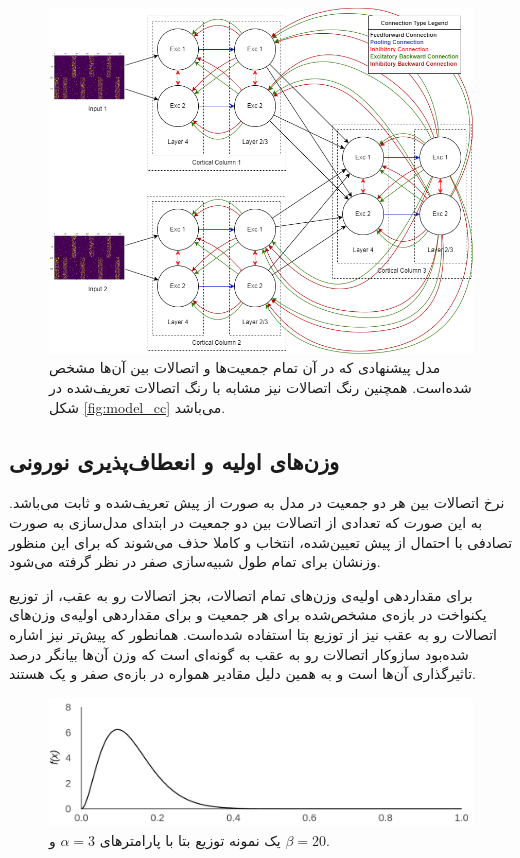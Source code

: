 \documentclass[12pt]{report}
\begin{document}
	\begin{figure}[]
		\centering
		\includegraphics[width=1.0\linewidth]{model_overall.png}
		\caption[NS]{
			مدل پیشنهادی که در آن تمام جمعیت‌ها و اتصالات بین آن‌ها مشخص شده‌است. همچنین رنگ اتصالات نیز مشابه با رنگ اتصالات تعریف‌شده در شکل \ref{fig:model_cc} می‌باشد.
		}
		\label{fig:model_overall} 
	\end{figure}

	\subsection{وزن‌های اولیه و انعطاف‌پذیری نورونی}
	نرخ اتصالات بین هر دو جمعیت در مدل به صورت از پیش تعریف‌شده و ثابت می‌باشد. به این صورت که تعدادی از اتصالات بین دو جمعیت در ابتدای مدل‌سازی به صورت تصادفی با احتمال از پیش تعیین‌شده، انتخاب و کاملا حذف می‌شوند که برای این منظور وزنشان برای تمام طول شبیه‌سازی صفر در نظر گرفته می‌شود.
	
	برای مقداردهی اولیه‌ی وزن‌های تمام اتصالات، بجز اتصالات رو به عقب، از توزیع یکنواخت در بازه‌ی مشخص‌شده برای هر جمعیت و برای مقداردهی اولیه‌ی وزن‌های اتصالات رو به عقب نیز از توزیع بتا استفاده شده‌است. همانطور که پیش‌تر نیز اشاره شده‌بود سازوکار اتصالات رو به عقب به گونه‌ای است که وزن آن‌ها بیانگر درصد تاثیرگذاری آن‌ها است و به همین دلیل مقادیر همواره در بازه‌ی صفر و یک هستند.
	
	\begin{figure}[]
		\centering
		\includegraphics[width=0.8\linewidth]{beta-3-20.png}
		\caption[NS]{
			یک نمونه توزیع بتا با پارامتر‌های $\alpha=3$ و $\beta=20$.
		}
		\label{fig:beta} 
	\end{figure}
	
\end{document}
